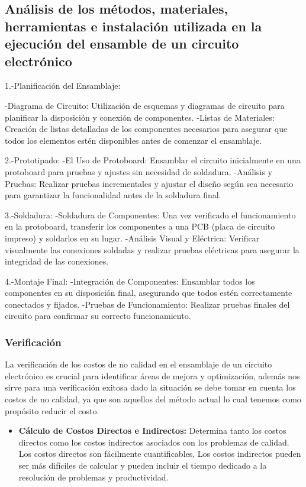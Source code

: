     \subsection{Análisis de los métodos, materiales, herramientas e instalación utilizada en la ejecución del ensamble de un circuito electrónico}
    1.-Planificación del Ensamblaje:
    
    -Diagrama de Circuito: Utilización de esquemas y diagramas de circuito para planificar la disposición y conexión de componentes.
    -Listas de Materiales: Creación de listas detalladas de los componentes necesarios para asegurar que todos los elementos estén disponibles antes de comenzar el ensamblaje.
    
    2.-Prototipado:
    -El Uso de Protoboard: Ensamblar el circuito inicialmente en una protoboard para pruebas y ajustes sin necesidad de soldadura.
    -Análisis y Pruebas: Realizar pruebas incrementales y ajustar el diseño según sea necesario para garantizar la funcionalidad antes de la soldadura final.
    
    3.-Soldadura:
    -Soldadura de Componentes: Una vez verificado el funcionamiento en la protoboard, transferir los componentes a una PCB (placa de circuito impreso) y soldarlos en su lugar.
    -Análisis Visual y Eléctrica: Verificar visualmente las conexiones soldadas y realizar pruebas eléctricas para asegurar la integridad de las conexiones.
    
    4.-Montaje Final:
    -Integración de Componentes: Ensamblar todos los componentes en su disposición final, asegurando que todos estén correctamente conectados y fijados.
    -Pruebas de Funcionamiento: Realizar pruebas finales del circuito  para confirmar su correcto funcionamiento.
    \subsubsection{Verificación}
    La verificación de los costos de no calidad en el ensamblaje de un circuito electrónico es crucial para identificar áreas de mejora y optimización, además nos sirve para una verificación exitosa dado la situación se debe tomar en cuenta los costos de no calidad, ya que son aquellos del método actual lo cual tenemos como propósito reducir el costo.
    \begin{itemize}
    \item \textbf{Cálculo de Costos Directos e Indirectos: }Determina tanto los costos directos como los costos indirectos asociados con los problemas de calidad. Los costos directos son fácilmente cuantificables, Los costos indirectos pueden ser más difíciles de calcular y pueden incluir el tiempo dedicado a la resolución de problemas y productividad.
    \end{itemize}
